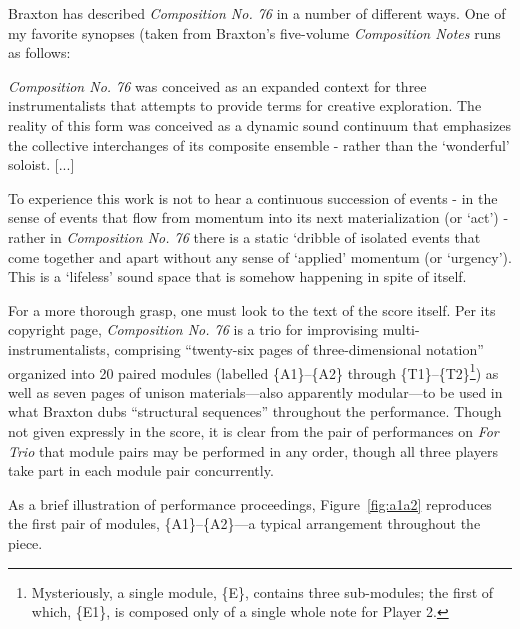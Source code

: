         Braxton has described \textit{Composition No. 76} in a number of different ways. One of my favorite synopses (taken from Braxton's five-volume \textit{Composition Notes} runs as follows:

        \begin{smallquote}
            \textit{Composition No. 76} was conceived as an expanded context for three instrumentalists that attempts to provide terms for creative exploration. The reality of this form was conceived as a dynamic sound continuum that emphasizes the collective interchanges of its composite ensemble - rather than the `wonderful' soloist. [...]

            \vspace{7pt}

            \noindent To experience this work is not to hear a continuous succession of events - in the sense of events that flow from momentum into its next materialization (or `act') - rather in \textit{Composition No. 76} there is a static `dribble of isolated events that come together and apart without any sense of `applied' momentum (or `urgency'). This is a `lifeless' sound space that is somehow happening in spite of itself.\autocite[145--8]{Braxton_1988}
        \end{smallquote}
    
        For a more thorough grasp, one must look to the text of the score itself. Per its copyright page, \textit{Composition No. 76} is a trio for improvising multi-instrumentalists, comprising ``twenty-six pages of three-dimensional notation'' organized into 20 paired modules (labelled \{A1\}--\{A2\} through \{T1\}--\{T2\}\footnote{Mysteriously, a single module, \{E\}, contains three sub-modules; the first of which, \{E1\}, is composed only of a single whole note for Player 2.}) as well as seven pages of unison materials---also apparently modular---to be used in what Braxton dubs ``structural sequences'' throughout the performance.\autocite[149]{Braxton_1988} Though not given expressly in the score, it is clear from the pair of performances on \textit{For Trio} that module pairs may be performed in any order, though all three players take part in each module pair concurrently.
        
        As a brief illustration of performance proceedings, Figure~\ref{fig:a1a2} reproduces the first pair of modules, \{A1\}--\{A2\}---a typical arrangement throughout the piece.
    
